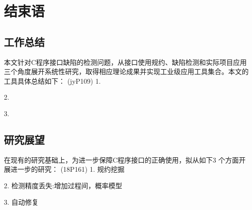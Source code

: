 \chapter{结束语}
\label{cha:con}

\section{工作总结}
本文针对C程序接口缺陷的检测问题，从接口使用规约、缺陷检测和实际项目应用三个角度展开系统性研究，取得相应理论成果并实现工业级应用工具集合。本文的工具具体总结如下：
(jyP109)
1.

2.

3.


\section{研究展望}
在现有的研究基础上，为进一步保障C程序接口的正确使用，拟从如下3 个方面开展进一步的研究：
(18P161)
1. 规约挖掘

2. 检测精度丢失:增加过程间，概率模型

3. 自动修复
